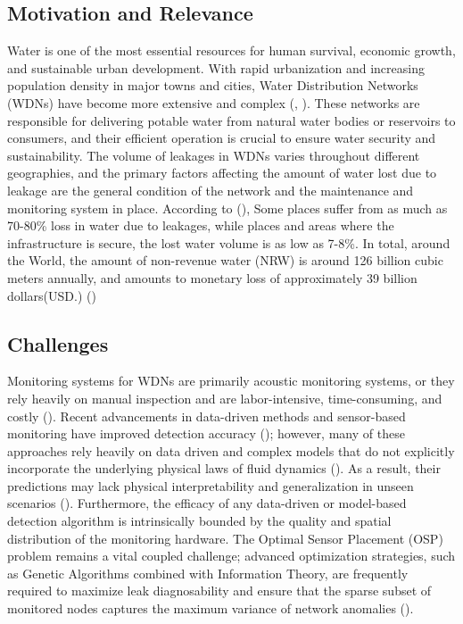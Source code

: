 \documentclass[final,5p,times,twocolumn,authoryear]{elsarticle}
\begin{document}
\subsection{Motivation and Relevance}
Water is one of the most essential resources for human survival, economic growth, and sustainable urban development. With rapid urbanization and increasing population density in major towns and cities, Water Distribution Networks (WDNs) have become more extensive and complex (\cite{SALEHI2022106936}, \cite{Gupta2018}).  These networks are responsible for delivering potable water from natural water bodies or reservoirs to consumers, and their efficient operation is crucial to ensure water security and sustainability.
The volume of leakages in WDNs varies throughout different geographies, and the primary factors affecting the amount of water lost due to leakage are the general condition of the network and the maintenance and monitoring system in place. According to (\cite{serafeim2024leakages}), Some places suffer from as much as 70-80\% loss in water due to leakages, while places and areas where the infrastructure is secure, the lost water volume is as low as 7-8\%. In total, around the World, the amount of non-revenue water (NRW) is around 126 billion cubic meters annually, and amounts to monetary loss of approximately 39 billion dollars(USD.) (\cite{article_liem})

\subsection{Challenges}
Monitoring systems for WDNs are primarily acoustic monitoring systems, or they rely heavily on manual inspection and are labor-intensive, time-consuming, and costly (\cite{w16202975}). Recent advancements in data-driven methods and sensor-based monitoring have improved detection accuracy (\cite{smartcities9030045}); however, many of these approaches rely heavily on data driven and complex models that do not explicitly incorporate the underlying physical laws of fluid dynamics (\cite{LIU2025111432}). As a result, their predictions may lack physical interpretability and generalization in unseen scenarios (\cite{s25165069}). Furthermore, the efficacy of any data-driven or model-based detection algorithm is intrinsically bounded by the quality and spatial distribution of the monitoring hardware. The Optimal Sensor Placement (OSP) problem remains a vital coupled challenge; advanced optimization strategies, such as Genetic Algorithms combined with Information Theory, are frequently required to maximize leak diagnosability and ensure that the sparse subset of monitored nodes captures the maximum variance of network anomalies (\cite{s22020443}).
\end{document}
